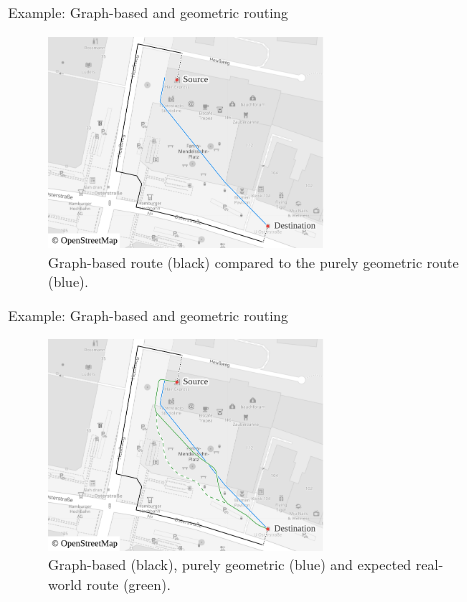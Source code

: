 \documentclass[xcolor={x11names}]{beamer}
\newenvironment{figcenter}
{%
	\parskip=0pt%
	\par%
	\nopagebreak%
	\centering%
}%
{%
	\par%
	\noindent%
	\ignorespacesafterend%
}
\begin{document}
		\begin{frame}[noframenumbering]{Example: Graph-based and geometric routing}
			\begin{figure}[t]
				\begin{figcenter}
					\includegraphics[width=0.65\textwidth]{images/qgis-routing-osterstrasse_routing-actual.pdf}
				\end{figcenter}
				\caption{Graph-based route (black) compared to the purely geometric route (blue).}
			\end{figure}
		\end{frame}
	
		\begin{frame}[noframenumbering]{Example: Graph-based and geometric routing}
			\begin{figure}[t]
				\begin{figcenter}
					\includegraphics[width=0.65\textwidth]{images/qgis-routing-osterstrasse_routing-actual-expected.pdf}
				\end{figcenter}
				\caption{Graph-based (black), purely geometric (blue) and expected real-world route (green).}
			\end{figure}
		\end{frame}
		
\end{document}
